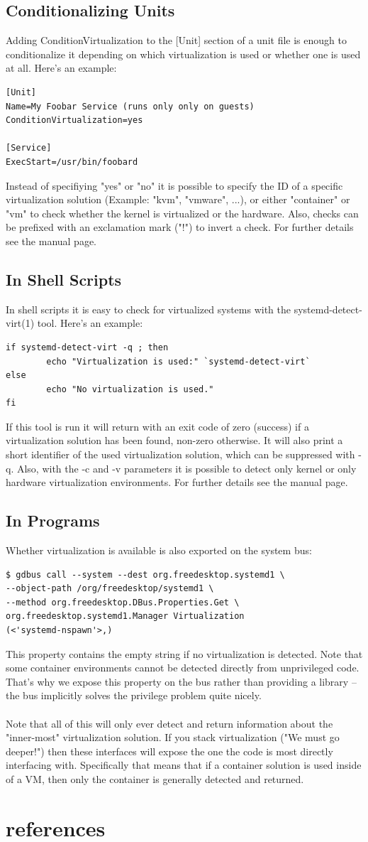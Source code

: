\documentclass[titlepage]{article}
\begin{document}
\subsection{Conditionalizing Units}
Adding ConditionVirtualization to the [Unit] section of a unit file is enough to conditionalize it depending on which virtualization is used or whether one is used at all. Here's an example:
\begin{lstlisting}
[Unit]
Name=My Foobar Service (runs only only on guests)
ConditionVirtualization=yes

[Service]
ExecStart=/usr/bin/foobard
\end{lstlisting}
Instead of specifiying "yes" or "no" it is possible to specify the ID of a specific virtualization solution (Example: "kvm", "vmware", ...), or either "container" or "vm" to check whether the kernel is virtualized or the hardware. Also, checks can be prefixed with an exclamation mark ("!") to invert a check. For further details see the manual page.
\subsection{In Shell Scripts}
In shell scripts it is easy to check for virtualized systems with the systemd-detect-virt(1) tool. Here's an example:
\begin{lstlisting}
if systemd-detect-virt -q ; then
        echo "Virtualization is used:" `systemd-detect-virt`
else
        echo "No virtualization is used."
fi
\end{lstlisting}
If this tool is run it will return with an exit code of zero (success) if a virtualization solution has been found, non-zero otherwise. It will also print a short identifier of the used virtualization solution, which can be suppressed with -q. Also, with the -c and -v parameters it is possible to detect only kernel or only hardware virtualization environments. For further details see the manual page.
\subsection{In Programs}
Whether virtualization is available is also exported on the system bus:
\begin{lstlisting}
$ gdbus call --system --dest org.freedesktop.systemd1 \
--object-path /org/freedesktop/systemd1 \ 
--method org.freedesktop.DBus.Properties.Get \ 
org.freedesktop.systemd1.Manager Virtualization
(<'systemd-nspawn'>,)
\end{lstlisting}
This property contains the empty string if no virtualization is detected. Note that some container environments cannot be detected directly from unprivileged code. That's why we expose this property on the bus rather than providing a library -- the bus implicitly solves the privilege problem quite nicely.
\\
\\
Note that all of this will only ever detect and return information about the "inner-most" virtualization solution. If you stack virtualization ("We must go deeper!") then these interfaces will expose the one the code is most directly interfacing with. Specifically that means that if a container solution is used inside of a VM, then only the container is generally detected and returned.
\section{references}
\nocite{*}


\end{document}
